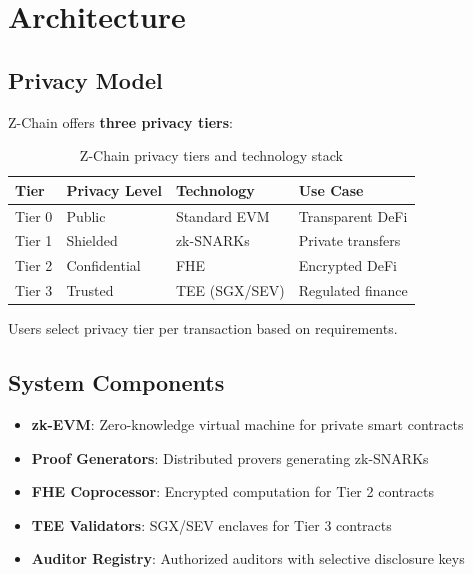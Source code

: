 \section{Architecture}


\subsection{Privacy Model}

Z-Chain offers \textbf{three privacy tiers}:

\begin{table}[h]
\centering
\begin{tabular}{llll}
\toprule
Tier & Privacy Level & Technology & Use Case \\
\midrule
Tier 0 & Public & Standard EVM & Transparent DeFi \\
Tier 1 & Shielded & zk-SNARKs & Private transfers \\
Tier 2 & Confidential & FHE & Encrypted DeFi \\
Tier 3 & Trusted & TEE (SGX/SEV) & Regulated finance \\
\bottomrule
\end{tabular}
\caption{Z-Chain privacy tiers and technology stack}
\end{table}

Users select privacy tier per transaction based on requirements.

\subsection{System Components}

\begin{itemize}[leftmargin=1.1em]
  \item \textbf{zk-EVM}: Zero-knowledge virtual machine for private smart contracts
  \item \textbf{Proof Generators}: Distributed provers generating zk-SNARKs
  \item \textbf{FHE Coprocessor}: Encrypted computation for Tier 2 contracts
  \item \textbf{TEE Validators}: SGX/SEV enclaves for Tier 3 contracts
  \item \textbf{Auditor Registry}: Authorized auditors with selective disclosure keys
\end{itemize}

